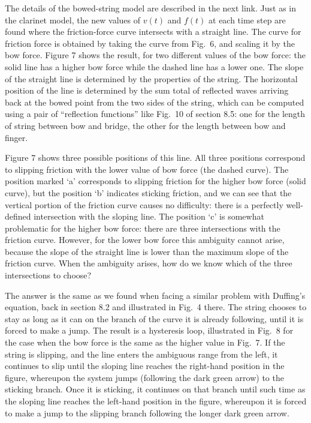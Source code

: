   The details of the bowed-string model are described in the next link. Just as 
  in the clarinet model, the new values of $v(t)$ and $f(t)$ at each time step 
  are found where the friction-force curve intersects with a straight line. The 
  curve for friction force is obtained by taking the curve from Fig.\ 6, and 
  scaling it by the bow force. Figure 7 shows the result, for two different 
  values of the bow force: the solid line has a higher bow force while the 
  dashed line has a lower one. The slope of the straight line is determined by 
  the properties of the string. The horizontal position of the line is 
  determined by the sum total of reflected waves arriving back at the bowed 
  point from the two sides of the string, which can be computed using a pair of 
  “reflection functions” like Fig.\ 10 of section 8.5: one for the length of 
  string between bow and bridge, the other for the length between bow and 
  finger. 

  Figure 7 shows three possible positions of this line. All three positions 
  correspond to slipping friction with the lower value of bow force (the dashed 
  curve). The position marked `a' corresponds to slipping friction for the 
  higher bow force (solid curve), but the position `b' indicates sticking 
  friction, and we can see that the vertical portion of the friction curve 
  causes no difficulty: there is a perfectly well-defined intersection with the 
  sloping line. The position `c' is somewhat problematic for the higher bow 
  force: there are three intersections with the friction curve. However, for 
  the lower bow force this ambiguity cannot arise, because the slope of the 
  straight line is lower than the maximum slope of the friction curve. When the 
  ambiguity arises, how do we know which of the three intersections to choose? 

  The answer is the same as we found when facing a similar problem with 
  Duffing's equation, back in section 8.2 and illustrated in Fig.\ 4 there. The 
  string chooses to stay as long as it can on the branch of the curve it is 
  already following, until it is forced to make a jump. The result is a 
  hysteresis loop, illustrated in Fig.\ 8 for the case when the bow force is 
  the same as the higher value in Fig.\ 7. If the string is slipping, and the 
  line enters the ambiguous range from the left, it continues to slip until the 
  sloping line reaches the right-hand position in the figure, whereupon the 
  system jumps (following the dark green arrow) to the sticking branch. Once it 
  is sticking, it continues on that branch until such time as the sloping line 
  reaches the left-hand position in the figure, whereupon it is forced to make 
  a jump to the slipping branch following the longer dark green arrow. 

